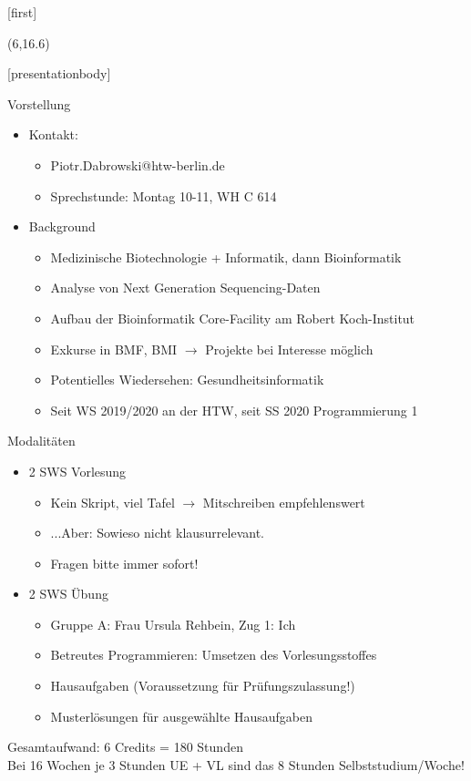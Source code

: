 \documentclass[t]{beamer}
\subtitle{1: Allgemeines}
\begin{document}
[first]

\begin{frame}[noframenumbering]
    \titlepage
    \begin{textblock}{10}(6,16.6)
	    \textcolor{white}{\cite{logo}}
    \end{textblock}
\end{frame}

[presentationbody] 

\begin{frame}{Vorstellung}
	\begin{itemize}
		\item Kontakt:
		\begin{itemize}
			\item Piotr.Dabrowski@htw-berlin.de
			\item Sprechstunde: Montag 10-11, WH C 614
		\end{itemize}
		\item Background
		\begin{itemize}
			\item Medizinische Biotechnologie + Informatik, dann Bioinformatik
			\item Analyse von Next Generation Sequencing-Daten
			\item Aufbau der Bioinformatik Core-Facility am Robert Koch-Institut
			\item Exkurse in BMF, BMI $\rightarrow$ Projekte bei Interesse möglich
			\item Potentielles Wiedersehen: Gesundheitsinformatik
			\item Seit WS 2019/2020 an der HTW, seit SS 2020 Programmierung 1
		\end{itemize}
	\end{itemize}
\end{frame}

\begin{frame}{Modalitäten}
	\begin{itemize}
		\item 2 SWS Vorlesung
		\begin{itemize}
			\item Kein Skript, viel Tafel $\rightarrow$ Mitschreiben empfehlenswert
			\item ...Aber: Sowieso nicht klausurrelevant.
			\item Fragen bitte immer sofort!
		\end{itemize}
		\item 2 SWS Übung
		\begin{itemize}
			\item Gruppe A: Frau Ursula Rehbein, Zug 1: Ich
			\item Betreutes Programmieren: Umsetzen des Vorlesungsstoffes
			\item Hausaufgaben (Voraussetzung für Prüfungszulassung!)
			\item Musterlösungen für ausgewählte Hausaufgaben
		\end{itemize}
	\end{itemize}
	Gesamtaufwand: 6 Credits = 180 Stunden\\
	Bei 16 Wochen je 3 Stunden UE + VL sind das 8 Stunden Selbststudium/Woche!
\end{frame}
\end{document}
